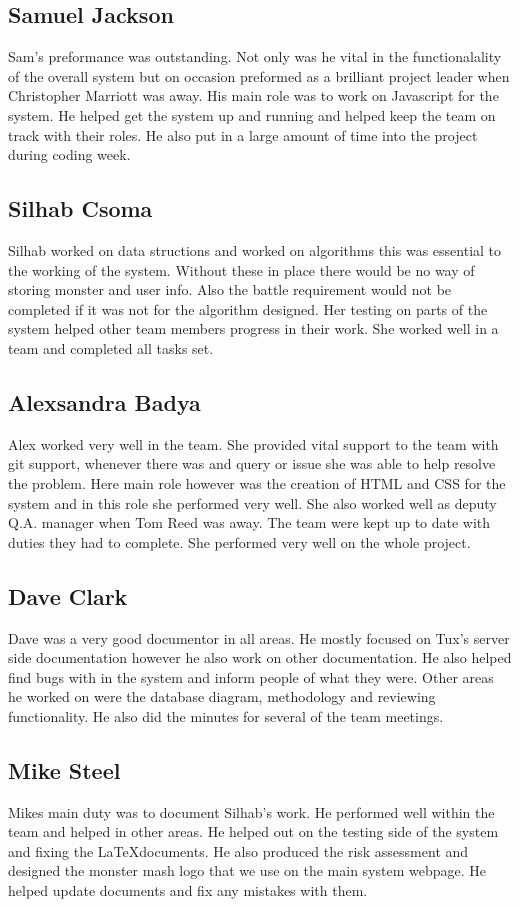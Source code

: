 \documentclass{project}
\begin{document}
\subsection{Samuel Jackson}
Sam's preformance was outstanding. Not only was he vital in the functionalality of the overall system but on occasion preformed as a brilliant project leader when Christopher Marriott was away. His main role was to work on Javascript for the system. He helped get the system up and running and helped keep the team on track with their roles. He also put in a large amount of time into the project during coding week.

\subsection{Silhab Csoma}
Silhab worked on data structions and worked on algorithms this was essential to the working of the system. Without these in place there would be no way of storing monster and user info. Also the battle requirement would not be completed if it was not for the algorithm designed. Her testing on parts of the system helped other team members progress in their work. She worked well in a team and completed all tasks set. 

\subsection{Alexsandra Badya}
Alex worked very well in the team. She provided vital support to the team with git support, whenever there was and query or issue she was able to help resolve the problem. Here main role however was the creation of HTML and CSS for the system and in this role she performed very well. She also worked well as deputy Q.A. manager when Tom Reed was away. The team were kept up to date with duties they had to complete. She performed very well on the whole project.

\subsection{Dave Clark}
Dave was a very good documentor in all areas. He mostly focused on Tux's server side documentation however he also work on other documentation. He also helped find bugs with in the system and inform people of what they were. Other areas he worked on were the database diagram, methodology and reviewing functionality. He also did the minutes for several of the team meetings.

\subsection{Mike Steel}
Mikes main duty was to document Silhab's work. He performed well within the team and helped in other areas. He helped out on the testing side of the system and fixing the \LaTeX  documents. He also produced the risk assessment and designed the monster mash logo that we use on the main system webpage. He helped update documents and fix any mistakes with them.
\end{document}
